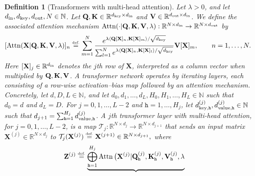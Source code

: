 \documentclass{article}
\newtheorem{definition}{Definition}[section]
\newcommand{\eqdef }{\ensuremath{\stackrel{\mbox{\upshape\tiny def.}}{=}}}
\begin{document}
\begin{definition}[Transformers with multi-head attention]
Let $\lambda>0$, and let $d_{\rm in},d_{{\rm key}},d_{\rm out},N\in \mathbb N$. 
Let
${\bf Q},{\bf K}\in \mathbb{R}^{d_{{\rm key}}\times d_{\rm in}}$
and
${\bf V}\in \mathbb{R}^{d_{\rm out}\times d_{\rm in}}$. 
We define the associated attention mechanism
$\operatorname{Attn}(\cdot|{\bf Q},{\bf K},{\bf V},\lambda):\mathbb{R}^{N\times d_{\rm in}}\to \mathbb{R}^{N\times d_{\rm out}}
$
by
\begin{equation} \label{eq:def_attention}
    [\operatorname{Attn}(\mathbf{X}|{\bf Q},{\bf K},{\bf V},\lambda)]_n
    \eqdef 
    \sum_{m=1}^N
    \frac{e^{\lambda \langle {\bf Q}[\mathbf{X}]_n, {\bf K}[\mathbf{X}]_m\rangle/\sqrt{d_{{\rm key}}}}}{
    \sum_{l=1}^N e^{\lambda \langle {\bf Q}[\mathbf{X}]_n, {\bf K}[\mathbf{X}]_l \rangle/\sqrt{d_{{\rm key}}}}}
    {\bf V}[\mathbf{X}]_m, \qquad n=1,\dots,N.
\end{equation}
Here $[\mathbf{X}]_j \in \mathbb{R}^{d_{\rm in}}$ denotes the $j$th row of $\mathbf{X}$, interpreted as a column vector when multiplied by ${\bf Q},{\bf K},{\bf V}$.
A transformer network operates by iterating layers, each consisting of a row-wise activation–bias map followed by an attention mechanism.
Concretely, let $d,D,L\in\mathbb{N}$, and let $d_0,d_1,\dots,d_L, H_0,H_1,\dots,H_L\in\mathbb{N}$ such that $d_0=d$ and $d_L=D$.
For $j=0,1,\dots,L-2$ and $\mathtt{h}=1,\dots,H_j$, let $d^{(j)}_{{\rm key}, \mathtt{h}}, d^{(j)}_{{\rm value}, \mathtt{h}}\in\mathbb{N}$ such that $d_{j+1} = \sum_{{\mathtt{h}}=1}^{H_j} d^{(j)}_{{\rm value}, \mathtt{h}}$.
A $j$th \emph{transformer layer with multi-head attention}, for $j=0,1,\dots,L-2$, is a map
$
\mathcal{T}_j:\mathbb{R}^{N\times d_j}\to \mathbb{R}^{N\times d_{j+1}}
$
that sends an input matrix $\mathbf{X}^{(j)}\in \mathbb{R}^{N\times d_j}$ to
$
\mathcal{T}_j(\mathbf{X}^{(j)})\eqdef  \mathbf{X}^{(j+1)}\in \mathbb{R}^{N\times d_{j+1}},
$
where 
\begin{alignat}{2} %
    \nonumber \mathbf{Z}^{(j)}
    &\eqdef 
    \underbrace{
        \bigoplus_{\mathtt{h}=1}^{H_j}
            \operatorname{Attn}\big(
                \mathbf{X}^{(j)}
                |{\bf Q}_{\mathtt{h}}^{(j)},{\bf K}_{\mathtt{h}}^{(j)},{\bf V}_{\mathtt{h}}^{(j)},\lambda
}
\end{alignat}
\end{definition}
\end{document}
